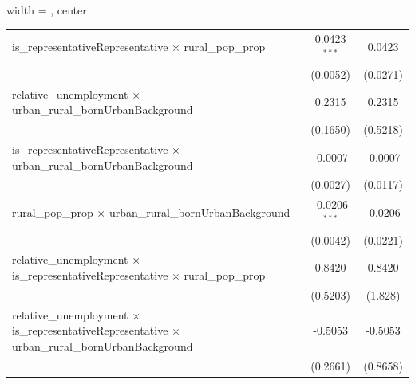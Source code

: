 \begin{adjustbox}{width = \textwidth, center}
\begin{tabular}{lcc}
      is\_representativeRepresentative $\times$ rural\_pop\_prop                                                                                     & 0.0423$^{***}$          & 0.0423\\   
                                                                                                                                                     & (0.0052)                & (0.0271)\\   
      relative\_unemployment $\times$ urban\_rural\_bornUrbanBackground                                                                              & 0.2315                  & 0.2315\\   
                                                                                                                                                     & (0.1650)                & (0.5218)\\   
      is\_representativeRepresentative $\times$ urban\_rural\_bornUrbanBackground                                                                    & -0.0007                 & -0.0007\\   
                                                                                                                                                     & (0.0027)                & (0.0117)\\   
      rural\_pop\_prop $\times$ urban\_rural\_bornUrbanBackground                                                                                    & -0.0206$^{***}$         & -0.0206\\   
                                                                                                                                                     & (0.0042)                & (0.0221)\\   
      relative\_unemployment $\times$ is\_representativeRepresentative $\times$ rural\_pop\_prop                                                     & 0.8420                  & 0.8420\\   
                                                                                                                                                     & (0.5203)                & (1.828)\\   
      relative\_unemployment $\times$ is\_representativeRepresentative $\times$ urban\_rural\_bornUrbanBackground                                    & -0.5053                 & -0.5053\\   
                                                                                                                                                     & (0.2661)                & (0.8658)\\   

\end{tabular}
\end{adjustbox}
